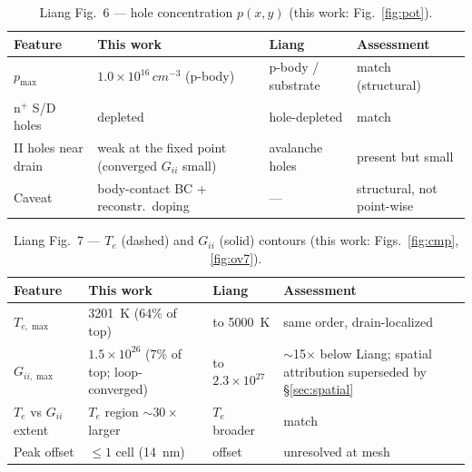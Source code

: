 \documentclass[11pt]{article}
\begin{document}
\begin{table}[h]\centering\small
\caption{Liang Fig.~6 --- hole concentration $p(x,y)$ (this work: Fig.~\ref{fig:pot}).}\label{tab:f6}
\begin{tabular}{p{3.5cm}p{3.9cm}p{2.9cm}p{3.2cm}}
\toprule
Feature & This work & Liang & Assessment \\
\midrule
$p_{\max}$ & $1.0\times10^{16}\,\si{cm^{-3}}$ (p-body) & p-body / substrate & match (structural) \\
n$^+$ S/D holes & depleted & hole-depleted & match \\
II holes near drain & weak at the fixed point (converged $G_{ii}$ small) & avalanche holes & present but small \\
Caveat & body-contact BC + reconstr.\ doping & --- & structural, not point-wise \\
\bottomrule
\end{tabular}
\end{table}

\begin{table}[h]\centering\small
\caption{Liang Fig.~7 --- $T_e$ (dashed) and $G_{ii}$ (solid) contours (this work: Figs.~\ref{fig:cmp},\ref{fig:ov7}).}\label{tab:f7}
\begin{tabular}{p{3.5cm}p{3.9cm}p{2.9cm}p{3.2cm}}
\toprule
Feature & This work & Liang & Assessment \\
\midrule
$T_{e,\max}$ & \SI{3201}{K} (64\% of top) & to \SI{5000}{K} & same order, drain-localized \\
$G_{ii,\max}$ & $1.5\times10^{26}$ (7\% of top; loop-converged) & to $2.3\times10^{27}$ & $\sim$15$\times$ below Liang; spatial attribution superseded by \S\ref{sec:spatial} \\
$T_e$ vs $G_{ii}$ extent & $T_e$ region $\sim\!30\times$ larger & $T_e$ broader & match \\
Peak offset & $\le\!1$ cell (14~nm) & offset & unresolved at mesh \\
\bottomrule
\end{tabular}
\end{table}
\end{document}
